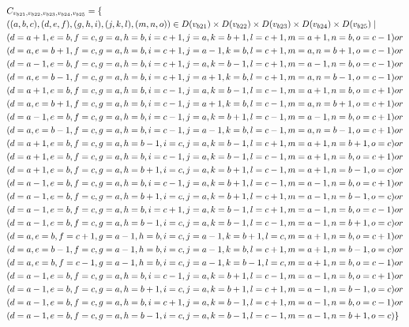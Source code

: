 \begin{small}
\begin{align*}
&C_{v_{b21},v_{b22},v_{b23},v_{b24},v_{b25}}=\{
\\&((a,b,c),(d,e,f),(g,h,i),(j,k,l),(m,n,o))\in D(v_{b21}) \times D(v_{b22})\times D(v_{b23})\times D(v_{b24})\times D(v_{b25}) \mid
\\&(d=a+1,e=b ,f=c , g=a ,h=b ,i=c+1,j=a ,k=b+1,l=c+1,m=a+1,n=b ,o=c-1)or
\\&(d=a ,e=b+1,f=c , g=a ,h=b ,i=c+1,j=a-1,k=b ,l=c+1,m=a ,n=b+1,o=c-1)or
\\&(d=a-1,e=b ,f=c , g=a ,h=b ,i=c+1,j=a ,k=b-1,l=c+1,m=a-1,n=b ,o=c-1)or
\\&(d=a ,e=b-1,f=c , g=a ,h=b ,i=c+1,j=a+1,k=b ,l=c+1,m=a ,n=b-1,o=c-1)or
\\&(d=a+1,e=b ,f=c , g=a ,h=b ,i=c-1,j=a ,k=b-1,l=c-1,m=a+1,n=b ,o=c+1)or
\\&(d=a ,e=b+1,f=c , g=a ,h=b ,i=c-1,j=a+1,k=b ,l=c-1,m=a ,n=b+1,o=c+1)or
\\&(d=a-1,e=b ,f=c , g=a ,h=b ,i=c-1,j=a ,k=b+1,l=c-1,m=a-1,n=b ,o=c+1)or
\\&(d=a ,e=b-1,f=c , g=a ,h=b ,i=c-1,j=a-1,k=b ,l=c-1,m=a ,n=b-1,o=c+1)or
\\&(d=a+1,e=b ,f=c , g=a ,h=b-1,i=c ,j=a ,k=b-1,l=c+1,m=a+1,n=b+1,o=c )or
\\&(d=a+1,e=b ,f=c , g=a ,h=b ,i=c-1,j=a ,k=b-1,l=c-1,m=a+1,n=b ,o=c+1)or
\\&(d=a+1,e=b ,f=c , g=a ,h=b+1,i=c ,j=a ,k=b+1,l=c-1,m=a+1,n=b-1,o=c )or
\\&(d=a-1,e=b ,f=c , g=a ,h=b ,i=c-1,j=a ,k=b+1,l=c-1,m=a-1,n=b ,o=c+1)or
\\&(d=a-1,e=b ,f=c , g=a ,h=b+1,i=c ,j=a ,k=b+1,l=c+1,m=a-1,n=b-1,o=c )or
\\&(d=a-1,e=b ,f=c , g=a ,h=b ,i=c+1,j=a ,k=b-1,l=c+1,m=a-1,n=b ,o=c-1)or
\\&(d=a-1,e=b ,f=c , g=a ,h=b-1,i=c ,j=a ,k=b-1,l=c-1,m=a-1,n=b+1,o=c )or
\\&(d=a ,e=b ,f=c+1, g=a-1,h=b ,i=c ,j=a-1,k=b+1,l=c ,m=a+1,n=b ,o=c+1)or
\\&(d=a ,e=b-1,f=c , g=a-1,h=b ,i=c ,j=a-1,k=b ,l=c+1,m=a+1,n=b-1,o=c )or
\\&(d=a ,e=b ,f=c-1, g=a-1,h=b ,i=c ,j=a-1,k=b-1,l=c ,m=a+1,n=b ,o=c-1)or
\\&(d=a-1,e=b ,f=c , g=a ,h=b ,i=c-1,j=a ,k=b+1,l=c-1,m=a-1,n=b ,o=c+1)or
\\&(d=a-1,e=b ,f=c , g=a ,h=b+1,i=c ,j=a ,k=b+1,l=c+1,m=a-1,n=b-1,o=c )or
\\&(d=a-1,e=b ,f=c , g=a ,h=b ,i=c+1,j=a ,k=b-1,l=c+1,m=a-1,n=b ,o=c-1)or
\\&(d=a-1,e=b ,f=c , g=a ,h=b-1,i=c ,j=a ,k=b-1,l=c-1,m=a-1,n=b+1,o=c )\}
\end{align*}
\end{small}
